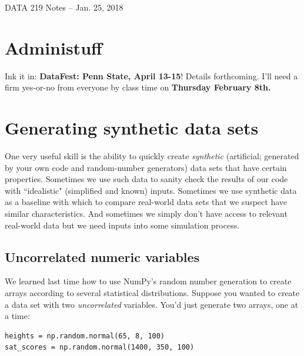 \documentclass[12pt]{article}
\begin{document}
\begin{center}
\begin{Large}
DATA 219 Notes -- Jan. 25, 2018
\end{Large}
\end{center}

\section{Administuff}

\begin{compactitem}

\item Ink it in: \textbf{DataFest: Penn State, April 13-15}! Details
forthcoming. I'll need a firm yes-or-no from everyone by class time on
\textbf{Thursday February 8th.}

\end{compactitem}

\section{Generating synthetic data sets}

One very useful skill is the ability to quickly create \textit{synthetic}
(artificial; generated by your own code and random-number generators) data
sets that have certain properties. Sometimes we use such data to sanity check
the results of our code with ``idealistic" (simplified and known) inputs.
Sometimes we use synthetic data as a baseline with which to compare real-world
data sets that we suspect have similar characteristics. And sometimes we
simply don't have access to relevant real-world data but we need inputs into
some simulation process.

\subsection{Uncorrelated numeric variables}

We learned last time how to use NumPy's random number generation to create
arrays according to several statistical distributions. Suppose you wanted to
create a data set with two \textit{uncorrelated} variables. You'd just
generate two arrays, one at a time:

\begin{Verbatim}[fontsize=small,samepage=true,frame=none]
heights = np.random.normal(65, 8, 100)
sat_scores = np.random.normal(1400, 350, 100)
\end{Verbatim}
\end{document}
